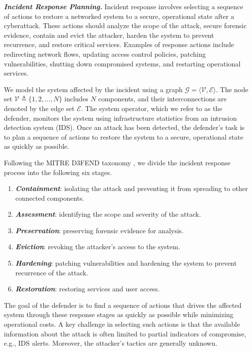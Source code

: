 \documentclass[runningheads,10pt]{llncs}
\begin{document}
\noindent\textit{\textbf{Incident Response Planning.}}
Incident response involves selecting a sequence of actions to restore a networked system to a secure, operational state after a cyberattack. These actions should analyze the scope of the attack, secure forensic evidence, contain and evict the attacker, harden the system to prevent recurrence, and restore critical services. Examples of response actions include redirecting network flows, updating access control policies, patching vulnerabilities, shutting down compromised systems, and restarting operational services.

We model the system affected by the incident using a graph $\mathcal{G}=\langle \mathcal{V}, \mathcal{E}\rangle$. The node set $\mathcal{V}\triangleq\{1, 2, \ldots, N\}$ includes $N$ components, and their interconnections are denoted by the edge set $\mathcal{E}$. The system operator, which we refer to as the defender, monitors the system using infrastructure statistics from an intrusion detection system (IDS). Once an attack has been detected, the defender's task is to plan a sequence of actions to restore the system to a secure, operational state as quickly as possible.

Following the MITRE D3FEND taxonomy \cite{d3fend}, we divide the incident response process into the following six stages.
\begin{enumerate}[nosep]
    \item \textit{\textbf{Containment}}: isolating the attack and preventing it from spreading to other connected components.
    \item \textit{\textbf{Assessment}}: identifying the scope and severity of the attack.
    \item \textit{\textbf{Preservation}}: preserving forensic evidence for analysis.
    \item \textit{\textbf{Eviction}}: revoking the attacker's access to the system.
    \item \textit{\textbf{Hardening}}: patching vulnerabilities and hardening the system to prevent recurrence of the attack.
    \item \textit{\textbf{Restoration}}: restoring services and user access.
\end{enumerate}
The goal of the defender is to find a sequence of actions that drives the affected system through these response stages as quickly as possible while minimizing operational costs. A key challenge in selecting such actions is that the available information about the attack is often limited to partial indicators of compromise, e.g., IDS alerts. Moreover, the attacker's tactics are generally unknown.
\end{document}
